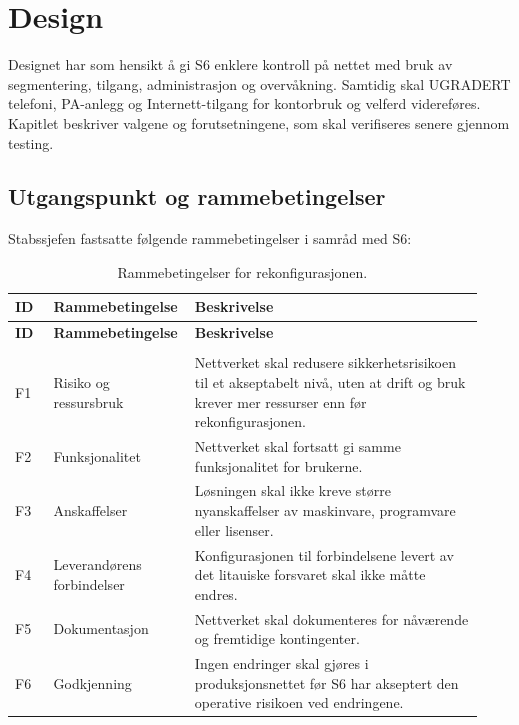 \begingroup
\captionsetup[table]{justification=centering,singlelinecheck=false}
\section{Design}
Designet har som hensikt å gi S6 enklere kontroll på nettet med bruk av segmentering, tilgang, administrasjon og overvåkning. Samtidig skal UGRADERT telefoni, PA-anlegg og Internett-tilgang for kontorbruk og velferd videreføres. Kapitlet beskriver valgene og forutsetningene, som skal verifiseres senere gjennom testing.

\subsection{Utgangspunkt og rammebetingelser}
Stabssjefen fastsatte følgende rammebetingelser i samråd med S6:


\begingroup
\small
\setlength{\tabcolsep}{4pt}
\renewcommand{\arraystretch}{1.0}
\captionsetup{justification=centering,singlelinecheck=false}
\begin{longtable}{>{\raggedright\arraybackslash}p{0.08\linewidth} >{\raggedright\arraybackslash}p{0.25\linewidth} >{\raggedright\arraybackslash}p{0.60\linewidth}}
\caption{Rammebetingelser for rekonfigurasjonen.}\label{tab:rammebetingelser}\\
\toprule
\rowcolor{tablegreen}
\color{white}\textbf{ID} & \color{white}\textbf{Rammebetingelse} & \color{white}\textbf{Beskrivelse} \\
\midrule
\endfirsthead
\toprule
\rowcolor{tablegreen}
\color{white}\textbf{ID} & \color{white}\textbf{Rammebetingelse} & \color{white}\textbf{Beskrivelse} \\
\midrule
\endhead
\midrule
\multicolumn{3}{r}{Fortsetter på neste side}\\
\endfoot
\bottomrule
\endlastfoot
F1 & Risiko og ressursbruk & Nettverket skal redusere sikkerhetsrisikoen til et akseptabelt nivå, uten at drift og bruk krever mer ressurser enn før rekonfigurasjonen. \\
\addlinespace
F2 & Funksjonalitet & Nettverket skal fortsatt gi samme funksjonalitet for brukerne. \\
\addlinespace
F3 & Anskaffelser & Løsningen skal ikke kreve større nyanskaffelser av maskinvare, programvare eller lisenser. \\
\addlinespace
F4 & Leverandørens forbindelser & Konfigurasjonen til forbindelsene levert av det litauiske forsvaret skal ikke måtte endres. \\
\addlinespace
F5 & Dokumentasjon & Nettverket skal dokumenteres for nåværende og fremtidige kontingenter. \\
\addlinespace
F6 & Godkjenning & Ingen endringer skal gjøres i produksjonsnettet før S6 har akseptert den operative risikoen ved endringene. \\
\end{longtable}
\endgroup

